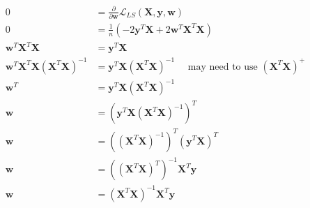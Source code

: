 \newcommand{\matrix}[1]{\mathbf{#1}}
\newcommand{\vector}[1]{\mathbf{#1}}
\newcommand{\X}{\matrix{X}}
\newcommand{\y}{\vector{y}}
\newcommand{\w}{\vector{w}}
\begin{align*}
0 &= \frac{\partial}{\partial \w} \mathcal{L}_{LS} (\X,\y,\w) \\
0 &= \frac{1}{n} (-2\y^T\X + 2\w^T\X^T\X) \\
\w^T\X^T\X &= \y^T\X \\
\w^T\X^T\X(\X^T\X)^{-1} &= \y^T\X(\X^T\X)^{-1} \quad \text{ may need to use } (\X^T\X)^+ \\
\w^T &= \y^T\X(\X^T\X)^{-1} \\
\w &= (\y^T\X(\X^T\X)^{-1})^T \\
\w &= ((\X^T\X)^{-1})^T (\y^T\X)^T \\
\w &= ((\X^T\X)^T)^{-1} \X^T\y \\
\w &= (\X^T\X)^{-1} \X^T\y \\
\end{align*}
